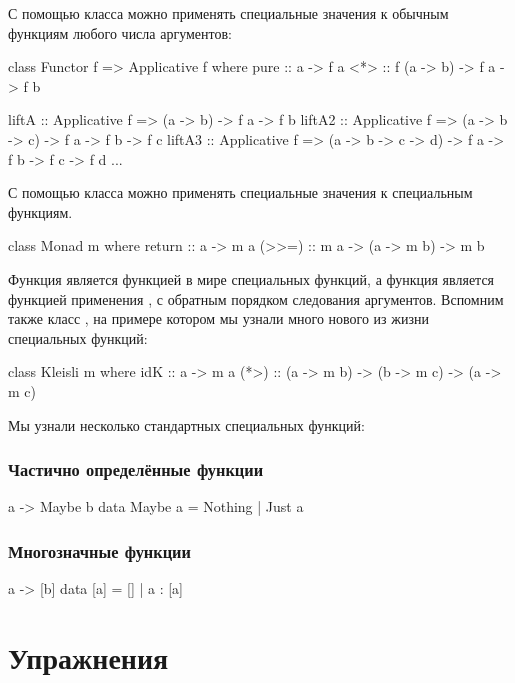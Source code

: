 С помощью класса  можно применять специальные
значения к обычным функциям любого числа аргументов:

\begin{code}
class Functor f => Applicative f where
    pure    :: a -> f a
    <*>     :: f (a -> b) -> f a -> f b

liftA  :: Applicative f => (a -> b) -> f a -> f b
liftA2 :: Applicative f => (a -> b -> c) -> f a -> f b -> f c
liftA3 :: Applicative f => (a -> b -> c -> d) -> f a -> f b -> f c -> f d
...
\end{code}


С помощью класса  можно применять специальные
значения к специальным функциям.

\begin{code}
class Monad m where
    return  :: a -> m a
    (>>=)   :: m a -> (a -> m b) -> m b
\end{code}

Функция  является функцией  в 
мире специальных функций, а функция \In{>>=} 
является функцией применения \In{($)}, с обратным 
порядком следования аргументов. Вспомним также
класс , на примере котором мы узнали много
нового из жизни специальных функций:

\begin{code}
class Kleisli m where
    idK     :: a -> m a
    (*>)    :: (a -> m b) -> (b -> m c) -> (a -> m c)
\end{code}

Мы узнали несколько стандартных специальных функций:

\subsubsection{Частично определённые функции}

\begin{code}
a -> Maybe b
data Maybe a = Nothing | Just a
\end{code}


\subsubsection{Многозначные функции}

\begin{code}
a -> [b]
data [a] = [] | a : [a]
\end{code}

\section{Упражнения}

